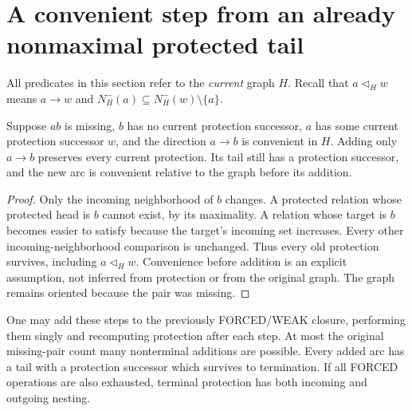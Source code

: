 \section{A convenient step from an already nonmaximal protected tail}
\label{sec:convenient-nonmax-tail-step}

All predicates in this section refer to the \emph{current} graph $H$.
Recall that $a\triangleleft_H w$ means $a\to w$ and
$N_H^-(a)\subseteq N_H^-(w)\setminus\{a\}$.

\begin{lemma}
\label{lem:convenient-nonmax-tail-safe-step}
Suppose $ab$ is missing, $b$ has no current protection successor,
$a$ has some current protection successor $w$, and the direction
$a\to b$ is convenient in $H$. Adding only $a\to b$ preserves every
current protection. Its tail still has a protection successor, and
the new arc is convenient relative to the graph before its addition.
\end{lemma}
\begin{proof}
Only the incoming neighborhood of $b$ changes. A protected relation
whose protected head is $b$ cannot exist, by its maximality. A relation
whose target is $b$ becomes easier to satisfy because the target's
incoming set increases. Every other incoming-neighborhood comparison
is unchanged. Thus every old protection survives, including
$a\triangleleft_H w$. Convenience before addition is an explicit
assumption, not inferred from protection or from the original graph.
The graph remains oriented because the pair was missing.
\end{proof}

One may add these steps to the previously FORCED/WEAK closure,
performing them singly and recomputing protection after each step.
At most the original missing-pair count many nonterminal additions
are possible. Every added arc has a tail with a protection successor
which survives to termination. If all FORCED operations are also
exhausted, terminal protection has both incoming and outgoing nesting.

